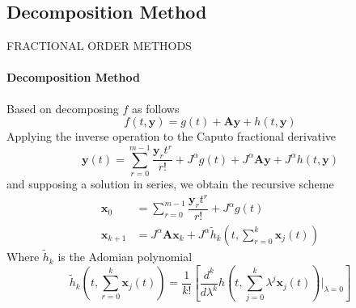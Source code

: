 \subsection{Decomposition Method}
\begin{frame}{FRACTIONAL ORDER METHODS}
\framesubtitle{Decomposition Method}
Based on decomposing $f$ as follows
    \begin{equation}
        f(t,\mathbf{y})=g(t)+\mathbf{Ay}+h(t,\mathbf{y})
    \end{equation}
Applying the inverse operation to the Caputo fractional derivative
\begin{equation}
    \mathbf{y}(t) = \sum_{r=0}^{m-1}\dfrac{\mathbf{y}_{r}t^r}{r!}+ J^\alpha g(t)+J^\alpha\mathbf{Ay}+J^\alpha h(t,\mathbf{y})
\end{equation}
and supposing a solution in series, we obtain the recursive scheme
\begin{equation}
    \begin{split}
        \mathbf{x}_0&=\sum_{r=0}^{m-1}\dfrac{\mathbf{y}_{r}t^r}{r!}+J^\alpha g(t)\\
        \mathbf{x}_{k+1}&=J^\alpha \mathbf{Ax}_k+J^\alpha \tilde{h}_k\left(t,\sum_{r=0}^k\mathbf{x}_j(t)\right)
    \end{split}
\end{equation}
Where $\tilde{h}_k$ is the Adomian polynomial
\begin{equation}
    \tilde{h}_k\left(t,\sum_{r=0}^{k}\mathbf{x}_j(t)\right)=\dfrac{1}{k!}\left[\dfrac{d^k}{d\lambda^k}h\left(t,\sum_{j=0}^{k}\lambda^j\mathbf{x}_j(t)\right)\Bigg|_{\lambda=0}\right]
\end{equation}
\end{frame}

